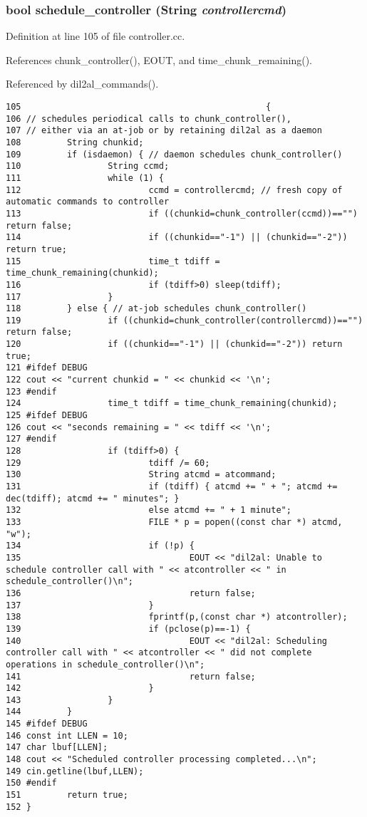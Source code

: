 \subsubsection{\setlength{\rightskip}{0pt plus 5cm}bool schedule\_\-controller ({\bf String} {\em controllercmd})}\label{controller_8cc_a2}




Definition at line 105 of file controller.cc.

References chunk\_\-controller(), EOUT, and time\_\-chunk\_\-remaining().

Referenced by dil2al\_\-commands().



\footnotesize\begin{verbatim}105                                                {
106 // schedules periodical calls to chunk_controller(),
107 // either via an at-job or by retaining dil2al as a daemon
108         String chunkid;
109         if (isdaemon) { // daemon schedules chunk_controller()
110                 String ccmd;
111                 while (1) {
112                         ccmd = controllercmd; // fresh copy of automatic commands to controller
113                         if ((chunkid=chunk_controller(ccmd))=="") return false;
114                         if ((chunkid=="-1") || (chunkid=="-2")) return true;
115                         time_t tdiff = time_chunk_remaining(chunkid);
116                         if (tdiff>0) sleep(tdiff);
117                 }
118         } else { // at-job schedules chunk_controller()
119                 if ((chunkid=chunk_controller(controllercmd))=="") return false;
120                 if ((chunkid=="-1") || (chunkid=="-2")) return true;
121 #ifdef DEBUG
122 cout << "current chunkid = " << chunkid << '\n';
123 #endif
124                 time_t tdiff = time_chunk_remaining(chunkid);
125 #ifdef DEBUG
126 cout << "seconds remaining = " << tdiff << '\n';
127 #endif
128                 if (tdiff>0) {
129                         tdiff /= 60;
130                         String atcmd = atcommand;
131                         if (tdiff) { atcmd += " + "; atcmd += dec(tdiff); atcmd += " minutes"; }
132                         else atcmd += " + 1 minute";
133                         FILE * p = popen((const char *) atcmd, "w");
134                         if (!p) {
135                                 EOUT << "dil2al: Unable to schedule controller call with " << atcontroller << " in schedule_controller()\n";
136                                 return false;
137                         }
138                         fprintf(p,(const char *) atcontroller);
139                         if (pclose(p)==-1) {
140                                 EOUT << "dil2al: Scheduling controller call with " << atcontroller << " did not complete operations in schedule_controller()\n";
141                                 return false;
142                         }
143                 }
144         }
145 #ifdef DEBUG
146 const int LLEN = 10;
147 char lbuf[LLEN];
148 cout << "Scheduled controller processing completed...\n";
149 cin.getline(lbuf,LLEN);
150 #endif
151         return true;
152 }
\end{verbatim}\normalsize 
